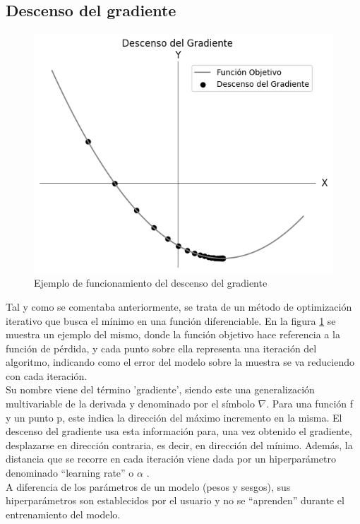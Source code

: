 
\subsection{Descenso del gradiente}

\begin{figure}[H]
	\centering
	\includegraphics[scale=0.4]{imagenes/sgd.jpg}  
	\caption{Ejemplo de funcionamiento del descenso del gradiente}
	\label{fig:SGD}
\end{figure}

Tal y como se comentaba anteriormente, se trata de un método de optimización iterativo que busca el mínimo en una función diferenciable. En la figura \ref{fig:SGD} se muestra un ejemplo del mismo, donde la función objetivo hace referencia a la función de pérdida, y cada punto sobre ella representa una iteración del algoritmo, indicando como el error del modelo sobre la muestra se va reduciendo con cada iteración. \\
Su nombre viene del término 'gradiente', siendo este una generalización multivariable de la derivada y denominado por el símbolo $\nabla$. Para una función f y un punto p, este indica la dirección del máximo incremento en la misma. El descenso del gradiente usa esta información para, una vez obtenido el gradiente, desplazarse en dirección contraria, es decir, en dirección del mínimo. Además, la distancia que se recorre en cada iteración viene dada por un hiperparámetro denominado ``learning rate'' o $\alpha$ \cite{SGD_1} \cite{Gradiente} \cite{SGD_2}. \\
A diferencia de los parámetros de un modelo (pesos y sesgos), sus hiperparámetros son establecidos por el usuario y no se ``aprenden'' durante el entrenamiento del modelo.


